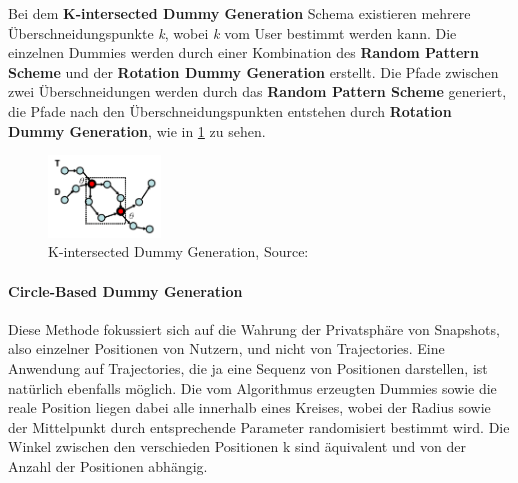 	Bei dem \textbf{K-intersected Dummy Generation} Schema existieren mehrere Überschneidungspunkte \textit{k}, wobei \textit{k} vom User bestimmt werden kann. Die einzelnen Dummies werden durch einer Kombination des \textbf{Random Pattern Scheme} und der \textbf{Rotation Dummy Generation} erstellt. Die Pfade zwischen zwei Überschneidungen werden durch das \textbf{Random Pattern Scheme} generiert, die Pfade nach den Überschneidungspunkten entstehen durch \textbf{Rotation Dummy Generation}, wie in \ref{fig_Lei2012KD} zu sehen.
	\begin{figure}[!h]
		\centering
		\includegraphics[width=3cm]{Bilder/Lei2012KD.png}
		\caption{K-intersected Dummy Generation, Source: \protect\cite{Lei2012}}
		\label{fig_Lei2012KD}
	\end{figure}
	\paragraph{Circle-Based Dummy Generation \cite{Lu2008}} Diese Methode fokussiert sich auf die Wahrung der Privatsphäre von Snapshots, also einzelner Positionen von Nutzern, und nicht von Trajectories. Eine Anwendung auf Trajectories, die ja eine Sequenz von Positionen darstellen, ist natürlich ebenfalls möglich. Die vom Algorithmus erzeugten Dummies sowie die reale Position liegen dabei alle innerhalb eines Kreises, wobei der Radius sowie der Mittelpunkt durch entsprechende Parameter randomisiert bestimmt wird. Die Winkel zwischen den verschieden Positionen k sind äquivalent und von der Anzahl der Positionen abhängig.
